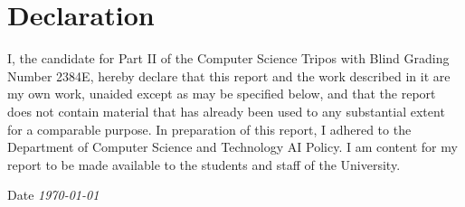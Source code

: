 \chapter*{Declaration}

I, the candidate for Part II of the Computer Science Tripos with Blind Grading Number 2384E, hereby declare that this report and the work described in it are my own work, unaided except as may be specified below, and that the report does not contain material that has already been used to any substantial extent for a comparable purpose. In preparation of this report, I adhered to the Department of Computer Science and Technology AI Policy. I am content for my report to be made available to the students and staff of the University.

Date {\it \today}